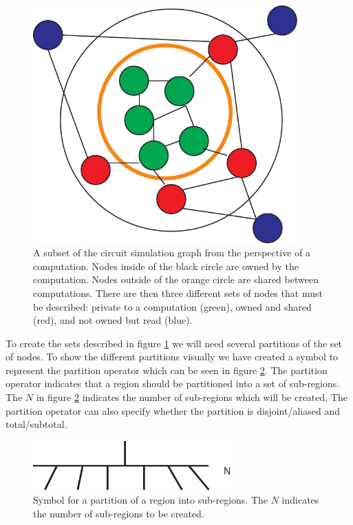 \documentclass{article}
\theoremstyle{definition}
\begin{document}
\begin{figure}[t]
\centering
\includegraphics[width=4in]{figs/GraphPartition.pdf}
\caption{A subset of the circuit simulation graph from the perspective of
a computation.  Nodes inside of the black circle are owned
by the computation.  Nodes outside of the orange circle are shared between
computations.  There are then three different sets of nodes that must be
described: private to a computation (green), owned and shared (red), and
not owned but read (blue). \label{fig:GraphPartition}}
\end{figure}

\noindent
To create the sets described in figure \ref{fig:GraphPartition} we will
need several partitions of the set of nodes.  To show the different partitions
visually we have created a symbol to represent the partition operator which
can be seen in figure \ref{fig:PartitionOperator}.  The partition operator
indicates that a region should be partitioned into a set of sub-regions.  The
$N$ in figure \ref{fig:PartitionOperator} indicates the number of sub-regions
which will be created.  The partition operator can also specify whether the
partition is disjoint/aliased and total/subtotal.\\

\begin{figure}[t]
\centering
\includegraphics[width=3in]{figs/PartitionSymbol.pdf}
\caption{Symbol for a partition of a region into sub-regions.  The $N$
indicates the number of sub-regions to be created. \label{fig:PartitionOperator}}
\end{figure}
\end{document}
